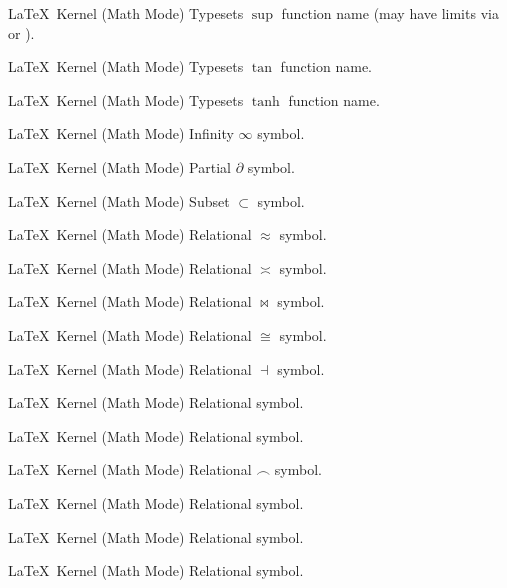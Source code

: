 %
 {}%
 {\LaTeX\ Kernel (Math Mode)}%
 {Typesets \ensuremath{\sup} function name (may have limits via  or ).}%
 {}

%
 {}%
 {\LaTeX\ Kernel (Math Mode)}%
 {Typesets \ensuremath{\tan} function name.}%
 {}

%
 {}%
 {\LaTeX\ Kernel (Math Mode)}%
 {Typesets \ensuremath{\tanh} function name.}%
 {}

%
 {}%
 {\LaTeX\ Kernel (Math Mode)}%
 {Infinity \ensuremath{\infty} symbol.}%
 {}

%
 {}%
 {\LaTeX\ Kernel (Math Mode)}%
 {Partial \ensuremath{\partial} symbol.}%
 {}

%
 {}%
 {\LaTeX\ Kernel (Math Mode)}%
 {Subset \ensuremath{\subset} symbol.}%
 {}

%
 {}%
 {\LaTeX\ Kernel (Math Mode)}%
 {Relational \ensuremath{\approx} symbol.}%
 {}

%
 {}%
 {\LaTeX\ Kernel (Math Mode)}%
 {Relational \ensuremath{\asymp} symbol.}%
 {}

%
 {}%
 {\LaTeX\ Kernel (Math Mode)}%
 {Relational \ensuremath{\bowtie} symbol.}%
 {}

%
 {}%
 {\LaTeX\ Kernel (Math Mode)}%
 {Relational \ensuremath{\cong} symbol.}%
 {}

%
 {}%
 {\LaTeX\ Kernel (Math Mode)}%
 {Relational \ensuremath{\dashv} symbol.}%
 {}

%
 {}%
 {\LaTeX\ Kernel (Math Mode)}%
 {Relational  symbol.}%
 {}

%
 {}%
 {\LaTeX\ Kernel (Math Mode)}%
 {Relational  symbol.}%
 {}

%
 {}%
 {\LaTeX\ Kernel (Math Mode)}%
 {Relational \ensuremath{\frown} symbol.}%
 {}

%
 {}%
 {\LaTeX\ Kernel (Math Mode)}%
 {Relational  symbol.}%
 {}

%
 {}%
 {\LaTeX\ Kernel (Math Mode)}%
 {Relational  symbol.}%
 {}

%
 {}%
 {\LaTeX\ Kernel (Math Mode)}%
 {Relational  symbol.}%
 {}

